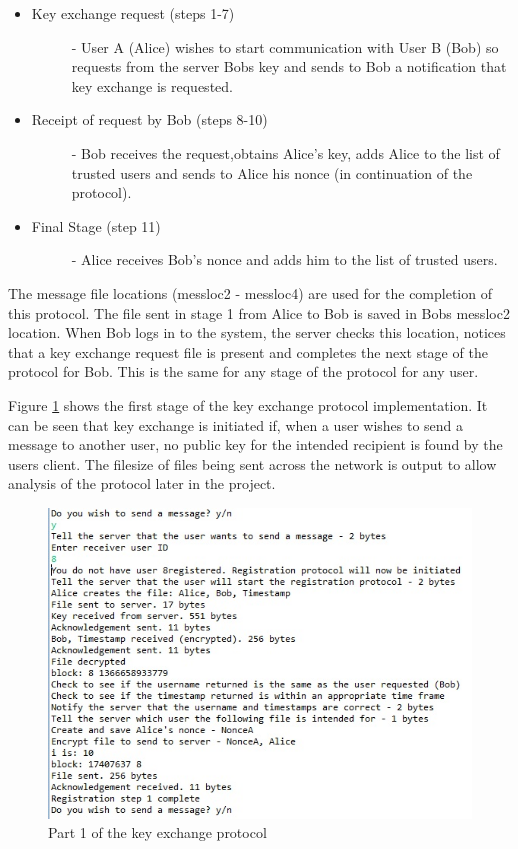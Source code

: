 \documentclass[a4paper,12pt]{report}
\begin{document}
\begin{itemize}
 \item \begin{description}
        \item[Key exchange request (steps 1-7)] - User A (Alice) wishes to start communication with User B (Bob) so requests from the server Bobs key and sends to Bob a notification that key exchange is requested. 
       \end{description} 
 \item \begin{description}
        \item[Receipt of request by Bob (steps 8-10)] - Bob receives the request,obtains Alice’s key, adds Alice to the list of trusted users and sends to Alice his nonce (in continuation of the protocol). 
       \end{description} 
 \item \begin{description}
        \item[Final Stage (step 11)] - Alice receives Bob’s nonce and adds him to the list of trusted users.
       \end{description} 
\end{itemize}

The message file locations (messloc2 - messloc4) are used for the completion of this protocol. The file sent in stage 1 from Alice to Bob is saved in Bobs messloc2 location. When Bob logs in to the system, the server checks this location, notices that a key exchange request file is present and completes the next stage of the protocol for Bob. This is the same for any stage of the protocol for any user.

Figure \ref{fig:keyex1} shows the first stage of the key exchange protocol implementation. It can be seen that key exchange is initiated if, when a user wishes to send a message to another user, no public key for the intended recipient is found by the users client. The filesize of files being sent across the network is output to allow analysis of the protocol later in the project. 

\begin{figure}[htb]
 \centering
 \includegraphics[scale=0.7]{images/screenshots/keyex1.jpg}
 \caption{Part 1 of the key exchange protocol}
 \label{fig:keyex1}
\end{figure}
\end{document}
